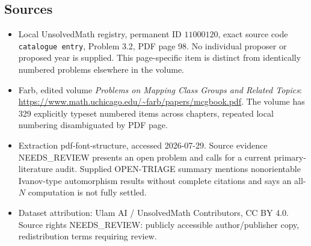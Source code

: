 \documentclass[11pt]{article}
\begin{document}
\subsection{Sources}
\begin{itemize}
\item Local UnsolvedMath registry, permanent ID \(11000120\), exact source code \texttt{catalogue entry}, Problem 3.2, PDF page 98. No individual proposer or proposed year is supplied. This page-specific item is distinct from identically numbered problems elsewhere in the volume.
\item Farb, edited volume \emph{Problems on Mapping Class Groups and Related Topics}: \url{https://www.math.uchicago.edu/~farb/papers/mcgbook.pdf}. The volume has 329 explicitly typeset numbered items across chapters, repeated local numbering disambiguated by PDF page.
\item Extraction pdf-font-structure, accessed 2026-07-29. Source evidence NEEDS\_REVIEW presents an open problem and calls for a current primary-literature audit. Supplied OPEN-TRIAGE summary mentions nonorientable Ivanov-type automorphism results without complete citations and says an all-\(N\) computation is not fully settled.
\item Dataset attribution: Ulam AI / UnsolvedMath Contributors, CC BY 4.0. Source rights NEEDS\_REVIEW: publicly accessible author/publisher copy, redistribution terms requiring review.
\end{itemize}
\end{document}
